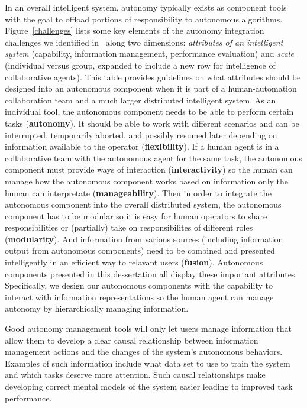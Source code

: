 In an overall intelligent system, autonomy typically exists as component tools with the goal to offload portions of responsibility to autonomous algorithms. Figure~\ref{challenges} lists some key elements of the autonomy integration challenges we identified in~\cite{Lin2010Supporting} along two dimensions: \textit{attributes of an intelligent system} (capability, information management, performance evaluation) and \textit{scale} (individual versus group, expanded to include a new row for intelligence of collaborative agents). This table provides guidelines on what attributes should be designed into an autonomous component when it is part of a human-automation collaboration team and a much larger distributed intelligent system. As an individual tool, the autonomous component needs to be able to perform certain tasks (\textbf{autonomy}). It should be able to work with different scenarios and can be interrupted, temporarily aborted, and possibly resumed later depending on information available to the operator (\textbf{flexibility}). If a human agent is in a collaborative team with the autonomous agent for the same task, the autonomous component must provide ways of interaction (\textbf{interactivity}) so the human can manage how the autonomous component works based on information only the human can interpretate (\textbf{manageability}). Then in order to integrate the autonomous component into the overall distributed system, the autonomous component has to be modular so it is easy for human operators to share responsibilities or (partially) take on responsibilites of different roles (\textbf{modularity}). And information from various sources (including information output from autonomous components) need to be combined and presented intelligently in an efficient way to relavant users (\textbf{fusion}). Autonomous components presented in this dessertation all display these important attributes. Specifically, we design our autonomous components with the capability to interact with information representations so the human agent can manage autonomy by hierarchically managing information. 

Good autonomy management tools will only let users manage information that allow them to develop a clear causal relationship between information management actions and the changes of the system's autonomous behaviors. Examples of such information include what data set to use to train the system and which tasks deserve more attention. Such causal relationships make developing correct mental models of the system easier leading to improved task performance. 


